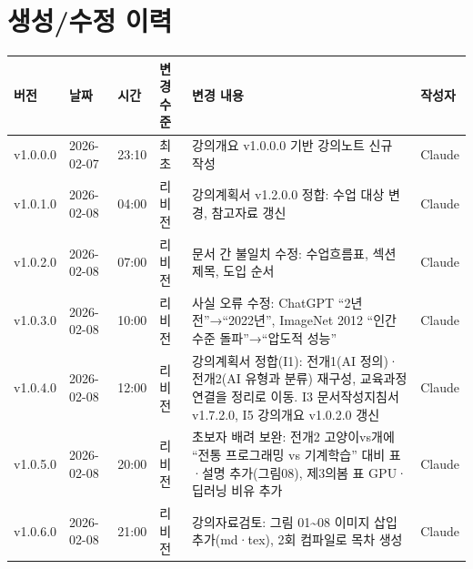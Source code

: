 \documentclass[11pt,a4paper]{article}
\begin{document}
\section*{생성/수정 이력}

\begin{center}
\begin{tabular}{|l|l|l|l|p{4.5cm}|l|}
\hline
\rowcolor{tableheader}
\textbf{버전} & \textbf{날짜} & \textbf{시간} & \textbf{변경 수준} & \textbf{변경 내용} & \textbf{작성자} \\
\hline
v1.0.0.0 & 2026-02-07 & 23:10 & 최초 & 강의개요 v1.0.0.0 기반 강의노트 신규 작성 & Claude \\
\hline
v1.0.1.0 & 2026-02-08 & 04:00 & 리비전 & 강의계획서 v1.2.0.0 정합: 수업 대상 변경, 참고자료 갱신 & Claude \\
\hline
v1.0.2.0 & 2026-02-08 & 07:00 & 리비전 & 문서 간 불일치 수정: 수업흐름표, 섹션 제목, 도입 순서 & Claude \\
\hline
v1.0.3.0 & 2026-02-08 & 10:00 & 리비전 & 사실 오류 수정: ChatGPT ``2년 전''→``2022년'', ImageNet 2012 ``인간 수준 돌파''→``압도적 성능'' & Claude \\
\hline
v1.0.4.0 & 2026-02-08 & 12:00 & 리비전 & 강의계획서 정합(I1): 전개1(AI 정의)·전개2(AI 유형과 분류) 재구성, 교육과정 연결을 정리로 이동. I3 문서작성지침서 v1.7.2.0, I5 강의개요 v1.0.2.0 갱신 & Claude \\
\hline
v1.0.5.0 & 2026-02-08 & 20:00 & 리비전 & 초보자 배려 보완: 전개2 고양이vs개에 ``전통 프로그래밍 vs 기계학습'' 대비 표·설명 추가(그림08), 제3의봄 표 GPU·딥러닝 비유 추가 & Claude \\
\hline
v1.0.6.0 & 2026-02-08 & 21:00 & 리비전 & 강의자료검토: 그림 01\textasciitilde 08 이미지 삽입 추가(md·tex), 2회 컴파일로 목차 생성 & Claude \\
\hline
\end{tabular}
\end{center}
\end{document}
